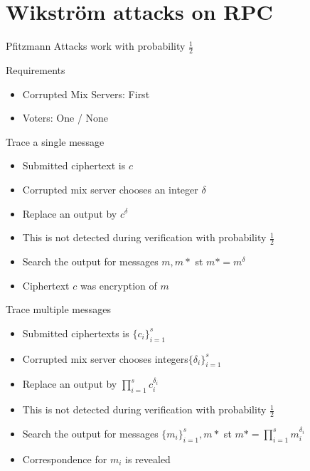 \documentclass{beamer}
\begin{document}
\section{Wikstr\"om attacks on RPC}

\begin{frame}[allowframebreaks]{Pfitzmann Attacks work with probability $\frac{1}{2}$}
\begin{block}{Requirements}
\begin{itemize}
\item Corrupted Mix Servers: First
\item Voters: One / None
\end{itemize}
\end{block}

\begin{block}{Trace a single message}
\begin{itemize}
\item Submitted ciphertext is $c$
\item Corrupted mix server chooses an integer $\delta$
\item Replace an output by $c^\delta$
\item This is not detected during verification with probability $\frac{1}{2}$
\item Search the output for messages $m, m*$ st $m*=m^\delta$
\item Ciphertext $c$ was encryption of $m$
\end{itemize}
\end{block}
\begin{block}{Trace multiple messages}
\begin{itemize}
\item Submitted ciphertexts is $\{c_i\}_{i=1}^s$
\item Corrupted mix server chooses integers$\{\delta_i\}_{i=1}^s$
\item Replace an output by $\prod_{i=1}^s c_i^{\delta_i}$
\item This is not detected during verification with probability $\frac{1}{2}$
\item Search the output for messages $\{m_i\}_{i=1}^s, m*$ st $m*=\prod_{i=1}^s m_i^{\delta_i}$
\item Correspondence for $m_i$ is revealed
\end{itemize}
\end{block}
\end{frame}
\end{document}
